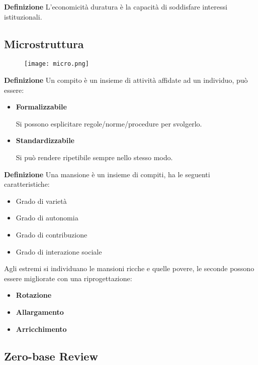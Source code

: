 \documentclass{article}
\newcommand{\df}{\noindent\textbf{Definizione }}
\begin{document}
\df L'economicità duratura è la capacità di soddisfare interessi istituzionali.

\newpage

\subsection{Microstruttura}

\begin{figure}[ht]
    \centering
    \texttt{[image: micro.png]}
\end{figure}

\vspace{4pt}

\df Un compito è un insieme di attività affidate ad un individuo, può essere:
\begin{itemize}
    \item \textbf{Formalizzabile}

        Si possono esplicitare regole/norme/procedure per svolgerlo.

    \item \textbf{Standardizzabile}

        Si può rendere ripetibile sempre nello stesso modo.\newline
    
\end{itemize}

\df Una mansione è un insieme di compiti, ha le seguenti caratteristiche:
\begin{itemize}
    \item Grado di varietà
    \item Grado di autonomia
    \item Grado di contribuzione
    \item Grado di interazione sociale
\end{itemize}

\noindent Agli estremi si individuano le mansioni ricche e quelle povere, le seconde possono essere migliorate con una riprogettazione:
\begin{itemize}
    \item \textbf{Rotazione}
    \item \textbf{Allargamento}
    \item \textbf{Arricchimento}
\end{itemize}

\subsection{Zero-base Review}
\end{document}
